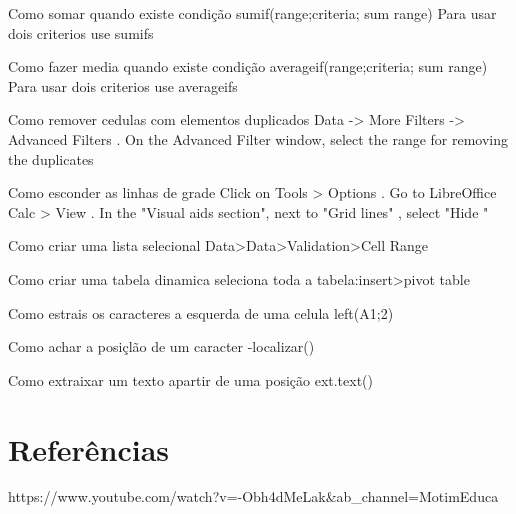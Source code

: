 Como somar quando existe condição
sumif(range;criteria; sum range)
Para usar dois criterios use sumifs

Como fazer media quando existe condição
averageif(range;criteria; sum range)
Para usar dois criterios use averageifs


Como remover cedulas com elementos duplicados
Data -> More Filters -> Advanced Filters . On the Advanced Filter window, select the range for removing the duplicates

Como esconder as linhas de grade
Click on Tools > Options . Go to LibreOffice Calc > View . In the "Visual aids section", next to "Grid lines" , select "Hide "


Como criar uma lista selecional
Data>Data>Validation>Cell Range

Como criar uma tabela dinamica
seleciona toda a tabela:insert>pivot table

Como estrais os caracteres a esquerda de uma celula
left(A1;2)

Como achar a posiçlão de um caracter
-localizar()

Como extraixar um texto apartir de uma posição
ext.text()


\chapter{Referências}
https://www.youtube.com/watch?v=-Obh4dMeLak&ab_channel=MotimEduca%